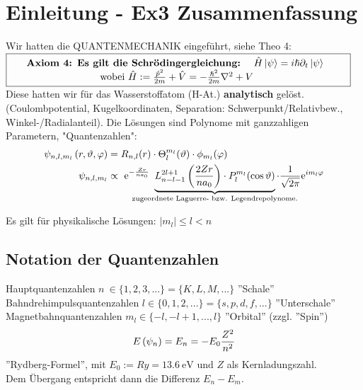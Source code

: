 \documentclass[Ex4_Zusammenfassung.tex]{subfiles}
\begin{document}
	
\chapter{Einleitung - Ex3 Zusammenfassung}
Wir hatten die QUANTENMECHANIK eingeführt, siehe Theo 4:\\

$ \fbox{\parbox{\dimexpr\linewidth-2\fboxsep-2\fboxrule\relax}
	{\centering 
		\textbf{Axiom 4:  Es gilt die  Schrödingergleichung: \ } 
		$  \hat{H} \ket{\psi} = i \hslash \partial_t \ket{\psi}\ $ \\
		wobei $ \hat{H} := \frac{\hat{p}^2}{2m} + \hat{V} = - \frac{\hslash^2}{2m} \nabla^2 + V$
		 } } $ \\

Diese hatten wir für das Wasserstoffatom (H-At.) \textbf{analytisch} gelöst. (Coulombpotential, Kugelkoordinaten, Separation: Schwerpunkt/Relativbew., Winkel-/Radialanteil). Die Lösungen sind Polynome mit ganzzahligen Parametern, "Quantenzahlen":
\begin{align*}
	\psi_{n,l,m_l}\lp r, \vartheta, \varphi \rp &= R_{n,l} (r) \cdot \Theta_l^{m_l} (\vartheta) \cdot \phi_{m_l} (\varphi)\\
	\psi_{n,l,m_l} &\propto\  \mathrm{e}^{- \frac{Zr}{na_0}}\  \underbrace{L_{n-l-1}^{2l+1} \lp \frac{2Zr}{na_0} \rp \cdot P_l^{m_l} (\cos{\vartheta})}_{\mathclap{\text{zugeordnete Laguerre- bzw. Legendrepolynome.}}} \cdot \frac{1}{\sqrt{2\pi}} \mathrm{e}^{im_l \varphi}\\
\end{align*}

Es gilt für physikalische Lösungen: $\boxed{ | m_l | \leq l < n } $\\ 

\section{Notation der Quantenzahlen}
Hauptquantenzahlen $n\ \in \{ 1, 2, 3, ... \} = \{K, L, M, ...\}$ ''Schale'' \\
Bahndrehimpulsquantenzahlen $ l \in \{0, 1, 2, ...\} = \{s, p, d, f, ...\} $ ''Unterschale'' \\
Magnetbahnquantenzahlen $m_l \in \{-l, -l+1, ... , l \}$ ''Orbital'' (zzgl. ''Spin'')\\
\begin{equation*}
	E \left( \psi_n \right) = E_n = -E_0 \frac{Z^2}{n^2}
\end{equation*}
''Rydberg-Formel'', mit $E_0 := Ry =\SI{13.6}{\eV} $ und $Z$ als Kernladungszahl.\\
Dem Übergang entspricht dann die Differenz $E_n - E_m$.
\end{document}
